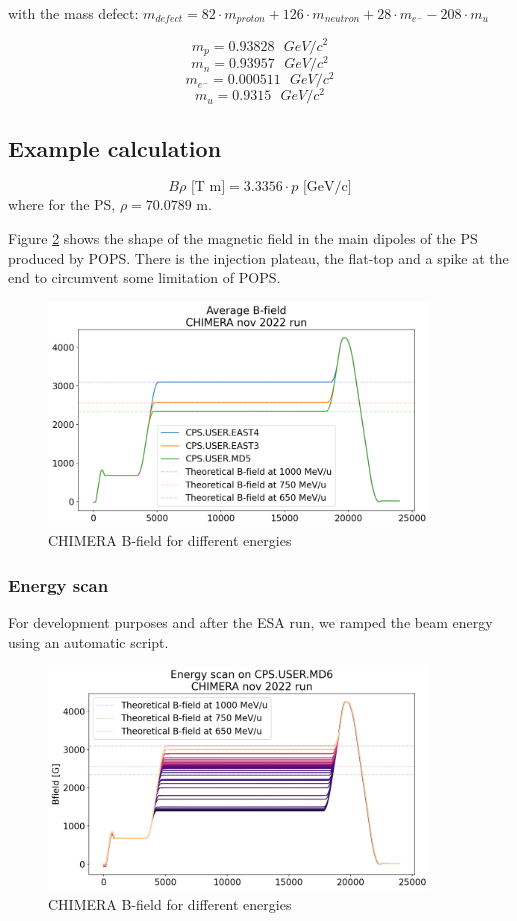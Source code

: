 with the mass defect: $m_{defect}=82\cdot m_{proton} + 126\cdot m_{neutron} + 28\cdot m_{e^{-}} - 208\cdot m_{u}$ 

$$m_{p} = 0.93828 \text{ } GeV/c^{2}$$
$$m_{n} = 0.93957 \text{ } GeV/c^{2}$$
$$m_{e^{-}} = 0.000511 \text{ } GeV/c^{2}$$
$$m_{u} = 0.9315 \text{ } GeV/c^{2}$$
\cite{boston_university_nuclear_nodate}

\subsection{Example calculation}

$$B\rho \text{ [T m]} = 3.3356\cdot p \text{ [GeV/c]}$$
where for the PS, $\rho = 70.0789$ m.

Figure \ref{fig:bfield} shows the shape of the magnetic field in the main dipoles of the PS produced by POPS. There is the injection plateau, the flat-top and a spike at the end to circumvent some limitation of POPS.

\begin{figure}[h]
\includegraphics[width=0.9\textwidth]{images/average_b_field_chimera.png}
\caption{CHIMERA B-field for different energies}
\label{fig:bfield}
\end{figure}

\subsubsection{Energy scan}

For development purposes and after the ESA run, we ramped the beam energy using an automatic script.

\begin{figure}[h]
\includegraphics[width=0.9\textwidth]{images/energy_scan_chimera 1.png}
\caption{CHIMERA B-field for different energies}
\label{fig:bfield}
\end{figure}


